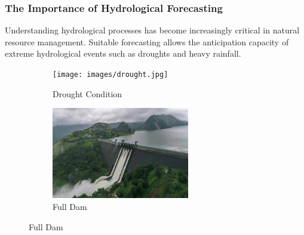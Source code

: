 \begin{frame}
	\frametitle{The Importance of Hydrological Forecasting}
	\begin{block}{}
	Understanding hydrological processes has become increasingly critical in natural resource management. Suitable forecasting allows the anticipation capacity of extreme hydrological events such as droughts and heavy rainfall.
	\end{block}
	\begin{figure}
		\centering
		\begin{subfigure}[b]{0.45\textwidth}
			\centering
			\texttt{[image: images/drought.jpg]}
			\caption{Drought Condition}
		\end{subfigure}
		\hfill
		\begin{subfigure}[b]{0.45\textwidth}
			\centering
			\includegraphics[width=\textwidth, height=4cm]{images/full_dam.jpg}
			\caption{Full Dam}
		\end{subfigure}
	\end{figure}
	
\end{frame}


